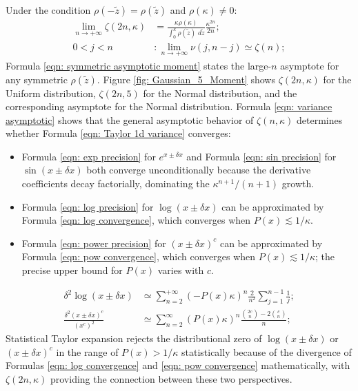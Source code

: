 \documentclass[twoside]{article}
\numberwithin{equation}{section}
\begin{document}
Under the condition $\rho(-\tilde{z}) =\rho(\tilde{z})$ and $\rho(\kappa) \neq 0$:
\begin{align}
\label{eqn: symmetric asymptotic moment}
\lim_{n \rightarrow +\infty} \zeta(2n, \kappa) 
		&= \frac{\kappa \rho(\kappa)}{ \int_{0}^{\kappa} \rho(\tilde{z}) \;d \tilde{z}} \frac{\kappa^{2n}}{2n}; \\
\label{eqn: variance asymptotic}
0 < j < n&: \lim_{n \rightarrow +\infty} \nu(j, n - j) \simeq \zeta(n);
\end{align}
Formula \eqref{eqn: symmetric asymptotic moment} states the large-$n$ asymptote for any symmetric $\rho(\tilde{z})$.
Figure \ref{fig: Gaussian_5_Moment} shows $\zeta(2n, \kappa)$ for the Uniform distribution, $\zeta(2n, 5)$ for the Normal distribution, and the corresponding asymptote for the Normal distribution.
Formula \eqref{eqn: variance asymptotic} shows that the general asymptotic behavior of $\zeta(n, \kappa)$ determines whether Formula \eqref{eqn: Taylor 1d variance} converges:
\begin{itemize}
\item Formula \eqref{eqn: exp precision} for $e^{x \pm \delta x}$ and Formula \eqref{eqn: sin precision} for $\sin(x \pm \delta x)$ both converge unconditionally because the derivative coefficients decay factorially, dominating the $\kappa^{n+1}/(n+1)$ growth.

\item Formula \eqref{eqn: log precision} for $\log(x \pm \delta x)$ can be approximated by Formula \eqref{eqn: log convergence}, which converges when $P(x) \lesssim 1/\kappa$.

\item Formula \eqref{eqn: power precision} for $(x \pm \delta x)^c$ can be approximated by Formula \eqref{eqn: pow convergence}, which converges when $P(x) \lesssim 1/\kappa$; the precise upper bound for $P(x)$ varies with $c$.
\end{itemize}
\begin{align}
\label{eqn: log convergence}
\delta^2\log(x\pm\delta x) &\simeq \sum_{n = 2}^{+\infty} (-P(x) \kappa)^{n} \frac{2}{n^2} \sum_{j=1}^{n-1} \frac{1}{j}; \\
\label{eqn: pow convergence}
\frac{\delta^2 (x \pm \delta x)^c}{(x^c)^2} &\simeq \sum_{n=2}^{\infty} (P(x)\kappa)^n \frac{\binom{2c}{n} - 2\binom{c}{n}}{n};
\end{align}
Statistical Taylor expansion rejects the distributional zero of $\log(x \pm \delta x)$ or $(x \pm \delta x)^c$ in the range of $P(x) > 1/\kappa$ statistically because of the divergence of Formulas \eqref{eqn: log convergence} and \eqref{eqn: pow convergence} mathematically, with $\zeta(2n, \kappa)$ providing the connection between these two perspectives.
\end{document}
